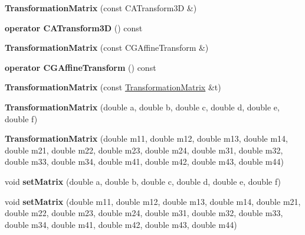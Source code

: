 \begin{DoxyCompactItemize}
{\bfseries Transformation\+Matrix} (const C\+A\+Transform3D \&)
\item 
\mbox{\label{class_web_core_1_1_transformation_matrix_a01e0f378f3e3fe395ce7639ca4a203b6}} 
{\bfseries operator C\+A\+Transform3D} () const
\item 
\mbox{\label{class_web_core_1_1_transformation_matrix_a3e1120e8e7e3cdec1d2f034f644c1139}} 
{\bfseries Transformation\+Matrix} (const C\+G\+Affine\+Transform \&)
\item 
\mbox{\label{class_web_core_1_1_transformation_matrix_a069d426c3fcb6e88bf07942488e95e17}} 
{\bfseries operator C\+G\+Affine\+Transform} () const
\item 
\mbox{\label{class_web_core_1_1_transformation_matrix_a0af3d2c1391e7be0b0cb1fc61281f597}} 
{\bfseries Transformation\+Matrix} (const \mbox{\hyperlink{class_web_core_1_1_transformation_matrix}{Transformation\+Matrix}} \&t)
\item 
\mbox{\label{class_web_core_1_1_transformation_matrix_a57058fb6c94c84b0921c416dd11542d1}} 
{\bfseries Transformation\+Matrix} (double a, double b, double c, double d, double e, double f)
\item 
\mbox{\label{class_web_core_1_1_transformation_matrix_a64cc30de371a6aae57c9a162977a0241}} 
{\bfseries Transformation\+Matrix} (double m11, double m12, double m13, double m14, double m21, double m22, double m23, double m24, double m31, double m32, double m33, double m34, double m41, double m42, double m43, double m44)
\item 
\mbox{\label{class_web_core_1_1_transformation_matrix_a0282cfc8d79f18e3af6b0cb63b0c2863}} 
void {\bfseries set\+Matrix} (double a, double b, double c, double d, double e, double f)
\item 
\mbox{\label{class_web_core_1_1_transformation_matrix_ae591912606d9e501ad82811d33c0bf16}} 
void {\bfseries set\+Matrix} (double m11, double m12, double m13, double m14, double m21, double m22, double m23, double m24, double m31, double m32, double m33, double m34, double m41, double m42, double m43, double m44)

\end{DoxyCompactItemize}
